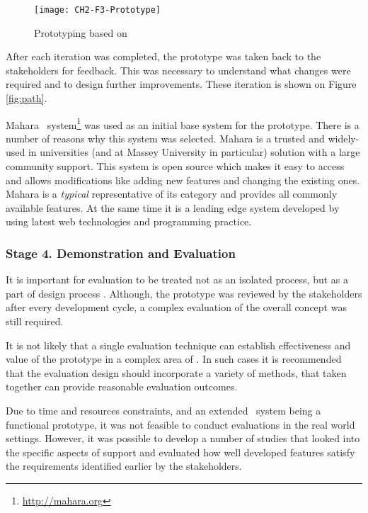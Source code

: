 \begin{figure}[htb]
\centering
\texttt{[image: CH2-F3-Prototype]}
\caption[Prototyping]{Prototyping based on \citet*[p.~411]{Sommerville2007}}
\label{fig:prototype}
\end{figure}

After each iteration was completed, the prototype was taken back to the
stakeholders for feedback. This was necessary to understand what changes were
required and to design further improvements. These iteration is shown on Figure
\ref{fig:path}.

Mahara \ep~system\footnote{\url{http://mahara.org}} was used as an initial base
system for the prototype. There is a number of reasons why this system was
selected. Mahara is a trusted and widely-used in universities (and at Massey
University in particular) solution with a large community support. This system
is open source which makes it easy to access and allows modifications like
adding new features and changing the existing ones. Mahara is a \textit{typical}
representative of its category and provides all commonly available features. At
the same time it is a leading edge system developed by using latest web
technologies and programming practice.

\subsubsection{Stage 4. Demonstration and Evaluation}

It is important for evaluation to be treated not as an isolated process, but as
a part of design process \citep{Cleven2009}. Although, the prototype was
reviewed by the stakeholders after every development cycle, a complex evaluation
of the overall concept was still required.

It is not likely that a single evaluation technique can establish effectiveness
and value of the prototype in a complex area of \LLLsn. In such cases it is
recommended \citep{Quinlan2008} that the evaluation design should incorporate a
variety of methods, that taken together can provide reasonable evaluation
outcomes.

Due to time and resources constraints, and an extended \ep~system being a
functional prototype, it was not feasible to conduct evaluations in the real
world settings. However, it was possible to develop a number of studies that
looked into the specific aspects of \LLLs support and evaluated how well
developed features satisfy the requirements identified earlier by the
stakeholders.
 
